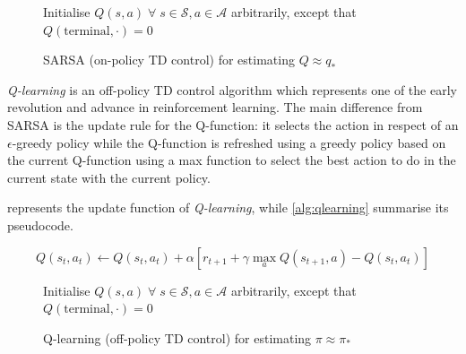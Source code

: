 \begin{figure}
	
	\begin{algorithm}[H]
		\SetAlgoLined
		\DontPrintSemicolon
		\LinesNumbered
		\KwIn{step size $\alpha \in (0,1]$, small $\epsilon > 0$\;}
		Initialise $Q(s,a) \; \forall\; s \in \mathcal{S}, a \in \mathcal{A}$ arbitrarily, except that $Q(\text{terminal}, \cdot) = 0$\;
		\caption{SARSA (on-policy TD control) for estimating $Q \approx q_*$}
		\label{alg:sarsa}
	\end{algorithm}
\end{figure}

\textit{Q-learning} \cite{watkins1989learning} is an off-policy TD control algorithm which represents one of the early revolution and advance in reinforcement learning.
The main difference from SARSA is the update rule for the Q-function: it selects the action in respect of an $\epsilon$-greedy policy while the Q-function is refreshed using a greedy policy based on the current Q-function using a max function to select the best action to do in the current state with the current policy.

 represents the update function of \textit{Q-learning}, while \vref{alg:qlearning} summarise its pseudocode.

\begin{equation}\label{eq:qlearning}
Q(s_t, a_t) \leftarrow Q(s_t, a_t) + \alpha [r_{t+1} + \gamma \max_{a}{Q(s_{t+1}, a)} - Q(s_t, a_t)]
\end{equation}

\begin{figure}
	
	\begin{algorithm}[H]
		\SetAlgoLined
		\DontPrintSemicolon
		\LinesNumbered
		\KwIn{step size $\alpha \in (0,1]$, small $\epsilon > 0$\;}
		Initialise $Q(s,a) \; \forall\; s \in \mathcal{S}, a \in \mathcal{A}$ arbitrarily, except that $Q(\text{terminal}, \cdot) = 0$\;
		\caption{Q-learning (off-policy TD control) for estimating $\pi \approx \pi_*$}
		\label{alg:qlearning}
	\end{algorithm}
\end{figure}


